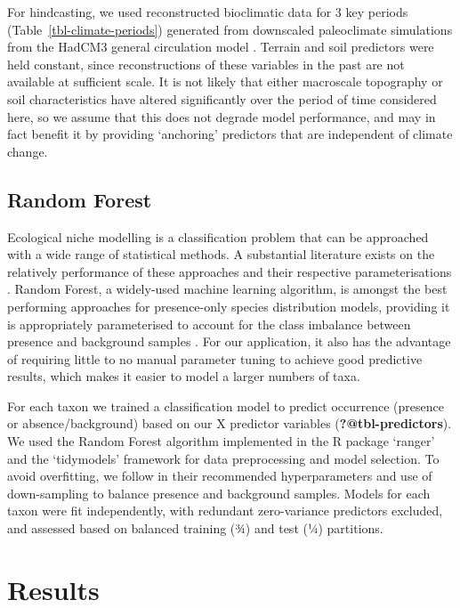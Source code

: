 \documentclass[
  authoryear,
  review]{elsarticle}
\begin{document}
For hindcasting, we used reconstructed bioclimatic data for 3 key
periods (Table~\ref{tbl-climate-periods}) generated from downscaled
paleoclimate simulations from the HadCM3 general circulation model
\citep{BrownEtAl2018}. Terrain and soil predictors were held constant,
since reconstructions of these variables in the past are not available
at sufficient scale. It is not likely that either macroscale topography
or soil characteristics have altered significantly over the period of
time considered here, so we assume that this does not degrade model
performance, and may in fact benefit it by providing `anchoring'
predictors that are independent of climate change.

\subsection{Random Forest}\label{random-forest}

Ecological niche modelling is a classification problem that can be
approached with a wide range of statistical methods. A substantial
literature exists on the relatively performance of these approaches and
their respective parameterisations \citep[reviewed
in][]{ValaviEtAl2022}. Random Forest, a widely-used machine learning
algorithm, is amongst the best performing approaches for presence-only
species distribution models, providing it is appropriately parameterised
to account for the class imbalance between presence and background
samples \citep{ValaviEtAl2021, ValaviEtAl2022}. For our application, it
also has the advantage of requiring little to no manual parameter tuning
to achieve good predictive results, which makes it easier to model a
larger numbers of taxa.

For each taxon we trained a classification model to predict occurrence
(presence or absence/background) based on our X predictor variables
(\textbf{?@tbl-predictors}). We used the Random Forest algorithm
implemented in the R package `ranger' \citep{WrightZiegler2017} and the
`tidymodels' \citep{tidymodels} framework for data preprocessing and
model selection. To avoid overfitting, we follow \citet{ValaviEtAl2021}
in their recommended hyperparameters and use of down-sampling to balance
presence and background samples. Models for each taxon were fit
independently, with redundant zero-variance predictors excluded, and
assessed based on balanced training (¾) and test (¼) partitions.

\section{Results}\label{results}
\end{document}
